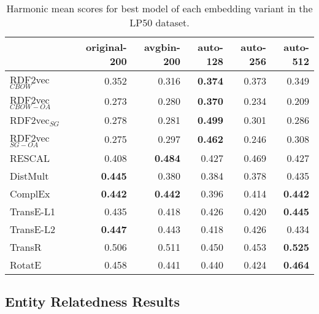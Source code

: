 \documentclass[11pt,titlepage,oneside,openany]{book}
\begin{document}
\begin{table}[h!]
\centering
\begin{tabular}{lrrrrr}
\toprule
{} &  original-200 &  avgbin-200 &  auto-128 &  auto-256 &  auto-512 \\
\midrule
RDF2vec$_{CBOW}$     &         0.352  &       0.316  &	\textbf{0.374} &     0.373  &     0.349  \\
RDF2vec$_{CBOW-OA}$  &         0.273  &       0.280  &	\textbf{0.370} &     0.234  &     0.209  \\
RDF2vec$_{SG}$       &         0.278  &       0.281  &	\textbf{0.499} &     0.301  &     0.286  \\
RDF2vec$_{SG-OA}$    &         0.275  &       0.297  &	\textbf{0.462} &     0.246  &     0.308  \\
RESCAL               &         0.408  &	\textbf{0.484} &     0.427  &     0.469  &     0.427  \\
DistMult             &	\textbf{0.445} &       0.380  &     0.384  &     0.378  &     0.435  \\
ComplEx              &	\textbf{0.442} &	\textbf{0.442} &     0.396  &     0.414  &	\textbf{0.442} \\
TransE-L1            &         0.435  &       0.418  &     0.426  &     0.420  &	\textbf{0.445} \\
TransE-L2            &	\textbf{0.447} &       0.443  &     0.418  &     0.426  &     0.434  \\
TransR               &         0.506  &       0.511  &     0.450  &     0.453  &	\textbf{0.525} \\
RotatE               &         0.458  &       0.441  &     0.440  &     0.424  &	\textbf{0.464} \\
\bottomrule
\end{tabular}
\caption{Harmonic mean scores for best model of each embedding variant in the LP50 dataset.}
\label{tab:geval-docsim-hm-lp50}
\end{table}

\subsection{Entity Relatedness Results}
\label{subsec:geval-ent-rel}
\end{document}
